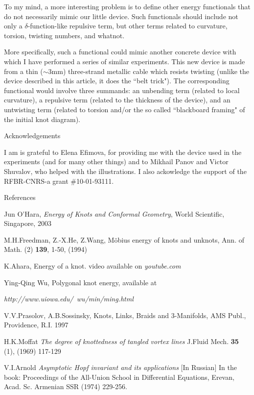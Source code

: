 \documentclass[12pt]{book}
\begin{document}
To my mind, a more interesting problem is to define other energy functionals that do not necessarily mimic our little device. Such functionals should include not only a $\delta$-function-like repulsive term, but other terms related to curvature, torsion, twisting numbers, and whatnot.    

More specifically, such a functional could mimic another concrete device with which I have performed a series of similar experiments. This new device is made from a 
thin ($\sim 3$mm) three-strand metallic cable which resists twisting (unlike the device described in this article, it does the ``belt trick"). The corresponding functional would involve three summands: an unbending term (related to local curvature), a repulsive  
term (related to the thickness of the device), and an untwisting term (related to torsion and/or the so called ``blackboard framing" of the initial knot diagram).  

\bigskip
\centerline{{\sc Acknowledgements}}

\medskip 
I am is grateful to Elena Efimova, for providing me with the device used in the experiments (and for many other things) and to Mikhail Panov and Victor Shuvalov, who helped with the illustrations. I also ackowledge the support of the RFBR-CNRS-a grant 
$\#$10-01-93111.    

\bigskip
\centerline{{\sc References}}

\medskip 
[1] Jun O'Hara, {\it Energy of Knots and Conformal Geometry}, World Scientific, Singapore, 2003

\smallskip
[2] M.H.Freedman, Z.-X.He, Z.Wang, M\"obius energy of knots and unknots,  Ann. of  Math. (2) {\bf 139}, 1-50, (1994)

\smallskip
[3] K.Ahara, Energy of a knot. video available on {\it youtube.com} 

\smallskip
[4] Ying-Qing Wu, Polygonal knot energy, available at 
    
\centerline{ {\it  http://www.uiowa.edu/~wu/min/ming.html }}  

\smallskip
[5] V.V.Prasolov, A.B.Sossinsky,  Knots, Links, Braids and 3-Manifolds, AMS Publ., 
Providence, R.I. 1997

\smallskip
[6] H.K.Moffat {\it The degree of knottedness of tangled vortex lines} J.Fluid Mech.
{\bf 35} (1), (1969) 117-129

\smallskip
[7] V.I.Arnold {\it Asymptotic Hopf invariant and its applications} [In Russian] In the book: Proceedings of the All-Union School in Differential Equations, Erevan, Acad. Sc. Armenian SSR (1974) 229-256. 
\end{document}
